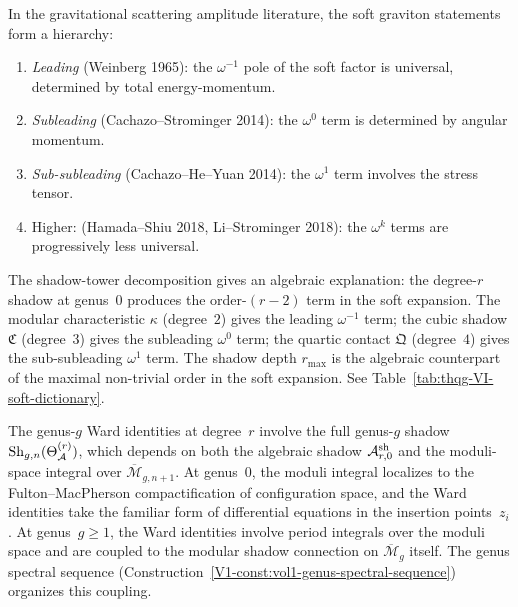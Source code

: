 \begin{remark}
In the gravitational scattering amplitude literature, the soft
graviton statements form a hierarchy:
\begin{enumerate}[label=\textup{(\arabic*)}]
\item \emph{Leading} (Weinberg 1965): the $\omega^{-1}$ pole of
 the soft factor is universal, determined by total energy-momentum.
\item \emph{Subleading} (Cachazo--Strominger 2014): the $\omega^0$
 term is determined by angular momentum.
\item \emph{Sub-subleading} (Cachazo--He--Yuan 2014): the
 $\omega^1$ term involves the stress tensor.
\item Higher: (Hamada--Shiu 2018, Li--Strominger 2018): the
 $\omega^k$ terms are progressively less universal.
\end{enumerate}
The shadow-tower decomposition gives an algebraic explanation:
the degree-$r$ shadow at genus~$0$ produces the order-$(r-2)$
term in the soft expansion. The modular characteristic $\kappa$
(degree~$2$) gives the leading $\omega^{-1}$ term; the cubic shadow
$\mathfrak{C}$ (degree~$3$) gives the subleading $\omega^0$ term;
the quartic contact $\mathfrak{Q}$ (degree~$4$) gives the
sub-subleading $\omega^1$ term. The shadow depth $r_{\max}$
is the algebraic counterpart of the maximal non-trivial order in
the soft expansion. See Table~\ref{tab:thqg-VI-soft-dictionary}.
\end{remark}

\begin{remark}
The genus-$g$ Ward identities at degree~$r$ involve the full
genus-$g$ shadow $\operatorname{Sh}_{g,n}(\Theta_{\mathcal{A}}^{(r)})$, which depends on
both the algebraic shadow $\mathcal{A}^{\mathrm{sh}}_{r,0}$ and the
moduli-space integral over $\overline{\mathcal{M}}_{g,n+1}$.
At genus~$0$, the moduli integral localizes to the
Fulton--MacPherson compactification of configuration space, and the
Ward identities take the familiar form of differential equations
in the insertion points~$z_i$.
At genus~$g \geq 1$, the Ward identities involve period integrals
over the moduli space and are coupled to the modular shadow
connection on $\overline{\mathcal{M}}_g$ itself. The genus
spectral sequence
(Construction~\ref{V1-const:vol1-genus-spectral-sequence})
organizes this coupling.
\end{remark}

